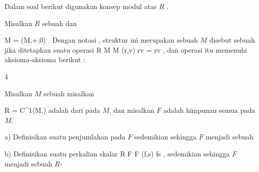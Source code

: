 Dalam soal berikut digunakan konsep modul atas $R$
 {} {.}

Misalkan $R$ sebuah
dan

\mavergleichskette
{\vergleichskette
{ M
}
{ = }{ (M,+,0)
}
{  }{
}
{    }{
}
{   }{
}
}
{}{}{}.
Dengan notasi  {}, struktur ini merupakan sebuah
$M$ disebut sebuah
jika ditetapkan suatu operasi
\maabbeledisp {} {R \times M } { M
} {(r,v)} { rv = r\cdot v
} {,}
 {} {}
dan operasi itu memenuhi aksioma-aksioma berikut
 {} {:}

{4}
{

Misalkan $M$ sebuah
misalkan

\mavergleichskette
{\vergleichskette
{ R
}
{ = }{ C^1(M,\R)
}
{  }{
}
{    }{
}
{   }{
}
}
{}{}{}
adalah
dari
pada $M$, dan misalkan $F$ adalah himpunan semua
pada $M$.

a) Definisikan suatu penjumlahan pada $F$ sedemikian sehingga $F$ menjadi sebuah

b) Definisikan suatu perkalian skalar
\maabbeledisp {} {R \times F } { F
} {(f,s)} {fs
} {,}
sedemikian sehingga $F$ menjadi sebuah
$R$-

}
{} {}
